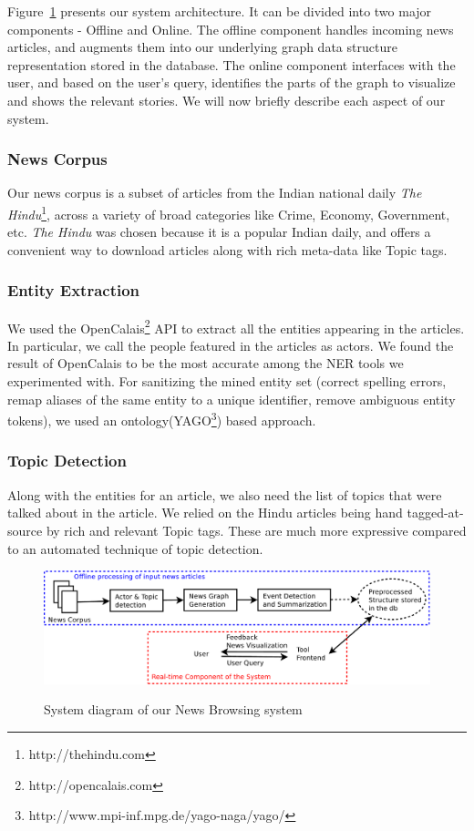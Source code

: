 Figure~\ref{fig:block-system-design} presents our system architecture. It can be divided into
two major components - Offline and Online. The offline component handles incoming news articles, and augments them into our underlying graph data structure representation stored
in the database. The online component interfaces with the user, and based on the user's query, identifies the parts of the graph to visualize and 
shows the relevant stories. We will now briefly describe each aspect of our system.

\subsubsection*{News Corpus}
Our news corpus is a subset of articles from the Indian national daily {\em The Hindu}\footnote{http://thehindu.com}, across a variety of broad categories like Crime, Economy, Government, etc. 
{\em The Hindu} was chosen because it is a popular Indian daily, and offers a convenient way to download articles along with rich meta-data like Topic tags.

\subsubsection*{Entity Extraction}
We used the OpenCalais\footnote{http://opencalais.com} API to extract all the entities appearing in the articles. In particular, we call
the people featured in the articles as actors. We found the result of OpenCalais to be the most accurate among the NER tools we experimented with.
For sanitizing the mined entity set (correct spelling errors, remap aliases of the same entity to a unique identifier, remove ambiguous entity tokens),
we used an ontology(YAGO\footnote{http://www.mpi-inf.mpg.de/yago-naga/yago/}) based approach.

\subsubsection*{Topic Detection}
Along with the entities for an article, we also need the list of topics that were talked about in the article. 
We relied on the Hindu articles being hand tagged-at-source by rich and relevant Topic tags. These are much more expressive compared to an automated technique of topic detection.
\begin{figure}
\caption{System diagram of our News Browsing system}
\includegraphics[scale=0.24]{figures/system-design.pdf}
\label{fig:block-system-design}
\end{figure}

